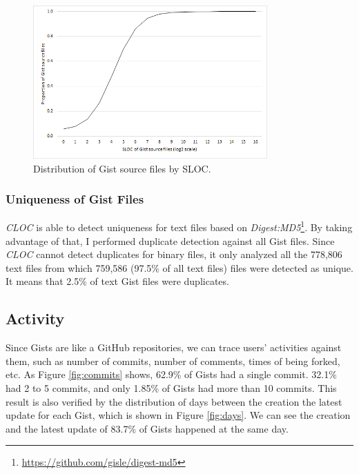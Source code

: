 \begin{figure}[!htb]
	\centering
	\includegraphics[width=0.8\textwidth]{figures/sloc.png}
	\caption{Distribution of Gist source files by SLOC.}
	\label{fig:sloc}
\end{figure}

\subsubsection{Uniqueness of Gist Files}
\textit{CLOC} is able to detect uniqueness for text files based on \textit{Digest:MD5}\footnote{\url{https://github.com/gisle/digest-md5}}. By taking advantage of that, I performed duplicate detection against all Gist files. Since \textit{CLOC} cannot detect duplicates for binary files, it only analyzed all the 778,806 text files from which 759,586 (97.5\% of all text files) files were detected as unique. It means that 2.5\% of text Gist files were duplicates.

\subsection{Activity}
Since Gists are like a GitHub repositories, we can trace users' activities against them, such as number of commits, number of comments, times of being forked, etc. As Figure \ref{fig:commits} shows, 62.9\% of Gists had a single commit. 32.1\% had 2 to 5 commits, and only 1.85\% of Gists had more than 10 commits. This result is also verified by the distribution of days between the creation the latest update for each Gist, which is shown in Figure \ref{fig:days}. We can see the creation and the latest update of 83.7\% of Gists happened at the same day. 

